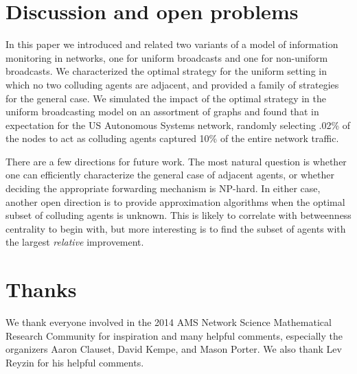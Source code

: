\documentclass[prodmode,acmec]{ec-acmsmall}
\begin{document}
\section{Discussion and open problems} \label{sec:conclusion}

In this paper we introduced and related two variants of a model of
information monitoring in networks, one for uniform broadcasts and one for
non-uniform broadcasts. We characterized the optimal strategy for the uniform
setting in which no two colluding agents are adjacent, and provided a family of
strategies for the general case. We simulated the impact of the optimal
strategy in the uniform broadcasting model on an assortment of graphs and found
that in expectation for the US Autonomous Systems network, randomly selecting
.02\% of the nodes to act as colluding agents captured 10\% of the entire
network traffic.  

There are a few directions for future work. The most natural question is
whether one can efficiently characterize the general case of adjacent agents,
or whether deciding the appropriate forwarding mechanism is NP-hard. In either
case, another open direction is to provide approximation algorithms when the
optimal subset of colluding agents is unknown. This is likely to correlate with
betweenness centrality to begin with, but more interesting is to find the
subset of agents with the largest \emph{relative} improvement.

\section{Thanks} 

We thank everyone involved in the 2014 AMS Network Science Mathematical
Research Community for inspiration and many helpful comments, especially the
organizers Aaron Clauset, David Kempe, and Mason Porter. We also thank Lev
Reyzin for his helpful comments.



\end{document}
